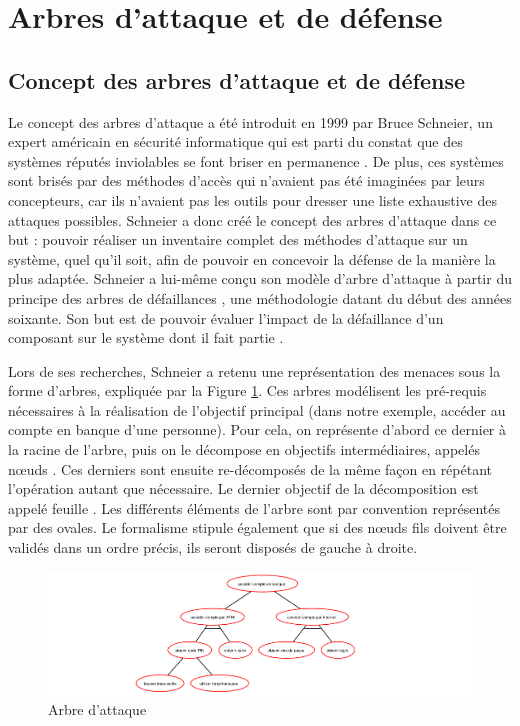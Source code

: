 \section{Arbres d'attaque et de défense}
	\label{sec:etat_art}

    \subsection{Concept des arbres d'attaque et de défense}
        Le concept des arbres d'attaque a été introduit en 1999 par Bruce Schneier, un expert américain en sécurité informatique qui est parti du constat que des systèmes réputés \og inviolables \fg se font briser en permanence \cite{doc_Schneier}. De plus, ces systèmes sont brisés par des méthodes d'accès qui n'avaient pas été imaginées par leurs concepteurs, car ils n'avaient pas les outils pour dresser une liste exhaustive des attaques possibles. Schneier a donc créé le concept des arbres d'attaque dans ce but : pouvoir réaliser un inventaire complet des méthodes d'attaque sur un système, quel qu'il soit, afin de pouvoir en concevoir la défense de la manière la plus adaptée. Schneier a lui-même conçu son modèle d'arbre d'attaque à partir du principe des \og arbres de défaillances \fg, une méthodologie datant du début des années soixante. Son but est de pouvoir évaluer l'impact de la défaillance d'un composant sur le système dont il fait partie \cite{defaillanceTree}.

	Lors de ses recherches, Schneier a retenu une représentation des menaces sous la forme d'arbres, expliquée par la Figure \ref{fig:arbre_exemple_1}. Ces arbres modélisent les pré-requis nécessaires à la réalisation de l'objectif principal (dans notre exemple, accéder au compte en banque d'une personne). Pour cela, on représente d'abord ce dernier à la racine de l'arbre, puis on le décompose en objectifs intermédiaires, appelés \og nœuds \fg. Ces derniers sont ensuite re-décomposés de la même façon en répétant l'opération autant que nécessaire. Le dernier objectif de la décomposition est appelé \og feuille \fg. Les différents éléments de l'arbre sont par convention représentés par des ovales. Le formalisme stipule également que si des nœuds fils doivent être validés dans un ordre précis, ils seront disposés de gauche à droite.
	
	\begin{figure}[htbp]
        \centering
        \includegraphics[width=\textwidth]{figure/exemple1_rapport.pdf}%
        \caption{Arbre d'attaque}
        \label{fig:arbre_exemple_1}
        \end{figure}

